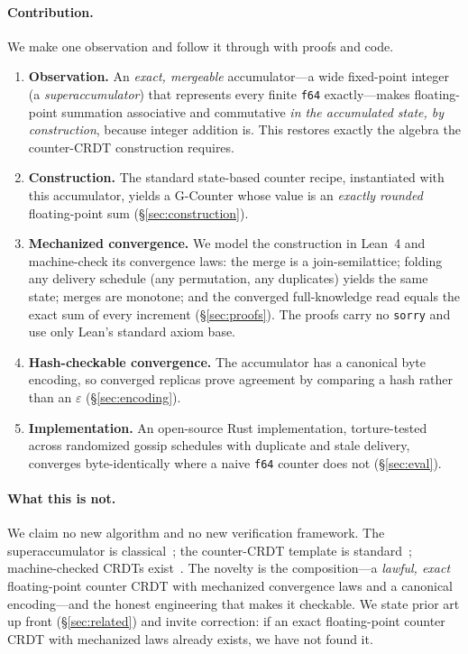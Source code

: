 \documentclass[11pt]{article}
\begin{document}
\paragraph{Contribution.} We make one observation and follow it through with proofs and code.
\begin{enumerate}[leftmargin=1.4em,itemsep=1pt]
  \item \textbf{Observation.} An \emph{exact, mergeable} accumulator---a wide fixed-point integer
  (a \emph{superaccumulator}) that represents every finite \texttt{f64} exactly---makes floating-point
  summation associative and commutative \emph{in the accumulated state, by construction}, because
  integer addition is. This restores exactly the algebra the counter-CRDT construction requires.
  \item \textbf{Construction.} The standard state-based counter recipe, instantiated with this
  accumulator, yields a G-Counter whose value is an \emph{exactly rounded} floating-point sum
  (\S\ref{sec:construction}).
  \item \textbf{Mechanized convergence.} We model the construction in Lean~4 and machine-check its
  convergence laws: the merge is a join-semilattice; folding any delivery schedule (any permutation,
  any duplicates) yields the same state; merges are monotone; and the converged full-knowledge read
  equals the exact sum of every increment (\S\ref{sec:proofs}). The proofs carry no \texttt{sorry} and
  use only Lean's standard axiom base.
  \item \textbf{Hash-checkable convergence.} The accumulator has a canonical byte encoding, so converged
  replicas prove agreement by comparing a hash rather than an $\varepsilon$ (\S\ref{sec:encoding}).
  \item \textbf{Implementation.} An open-source Rust implementation, torture-tested across randomized
  gossip schedules with duplicate and stale delivery, converges byte-identically where a naive
  \texttt{f64} counter does not (\S\ref{sec:eval}).
\end{enumerate}

\paragraph{What this is not.} We claim no new algorithm and no new verification framework. The
superaccumulator is classical~\cite{kulisch,neal,demmel}; the counter-CRDT template is
standard~\cite{shapiro}; machine-checked CRDTs exist~\cite{gomes}. The novelty is the composition---a
\emph{lawful, exact} floating-point counter CRDT with mechanized convergence laws and a canonical
encoding---and the honest engineering that makes it checkable. We state prior art up front
(\S\ref{sec:related}) and invite correction: if an exact floating-point counter CRDT with mechanized
laws already exists, we have not found it.
\end{document}

